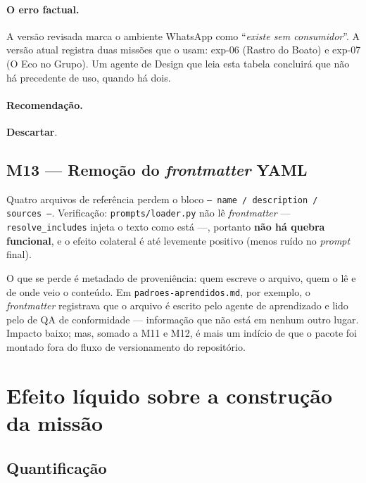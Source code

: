 \documentclass[11pt,a4paper]{article}
\newcommand{\Vermelho}[1]{\textcolor{vermelho}{\textbf{#1}}}
\newcommand{\cod}[1]{\texttt{\small #1}}
\begin{document}
\paragraph{O erro factual.} A versão revisada marca o ambiente WhatsApp como ``\textit{existe sem
consumidor}''. A versão atual registra duas missões que o usam: exp-06 (Rastro do Boato) e exp-07 (O Eco no
Grupo). Um agente de Design que leia esta tabela concluirá que não há precedente de uso, quando há dois.

\paragraph{Recomendação.} \Vermelho{Descartar}.

\subsection{M13 --- Remoção do \textit{frontmatter} YAML}

Quatro arquivos de referência perdem o bloco \cod{---\ name / description / sources\ ---}. Verificação:
\cod{prompts/loader.py} não lê \textit{frontmatter} --- \cod{resolve\_includes} injeta o texto como está ---,
portanto \textbf{não há quebra funcional}, e o efeito colateral é até levemente positivo (menos ruído no
\textit{prompt} final).

O que se perde é metadado de proveniência: quem escreve o arquivo, quem o lê e de onde veio o conteúdo.
Em \cod{padroes-aprendidos.md}, por exemplo, o \textit{frontmatter} registrava que o arquivo é escrito pelo
agente de aprendizado e lido pelo de QA de conformidade --- informação que não está em nenhum outro lugar.
Impacto baixo; mas, somado a M11 e M12, é mais um indício de que o pacote foi montado fora do fluxo de
versionamento do repositório.

\newpage
\section{Efeito líquido sobre a construção da missão}

\subsection{Quantificação}
\end{document}
